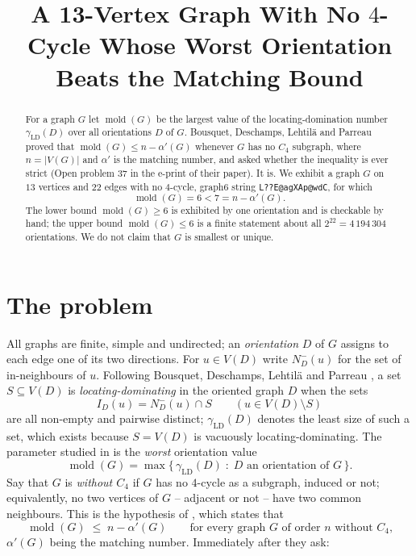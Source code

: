 \documentclass[11pt]{amsart}
\title[A graph with no $4$-cycle beating the matching bound]
{A 13-Vertex Graph With No $4$-Cycle Whose Worst Orientation\\ Beats the Matching Bound}
\date{}
\theoremstyle{definition}
\theoremstyle{remark}
\DeclareMathOperator{\mold}{mold}
\newcommand{\gammaLD}{\gamma_{\mathrm{LD}}}
\newcommand{\Nin}{N^-}
\begin{document}
\begin{abstract}
For a graph $G$ let $\mold(G)$ be the largest value of the locating-domination
number $\gammaLD(D)$ over all orientations $D$ of $G$. Bousquet, Deschamps,
Lehtil\"a and Parreau proved that $\mold(G)\le n-\alpha'(G)$ whenever $G$ has
no $C_4$ subgraph, where $n=|V(G)|$ and $\alpha'$ is the matching number, and
asked whether the inequality is ever strict (Open problem 37 in the e-print of
their paper). It is. We exhibit a graph $G$ on $13$ vertices and $22$ edges
with no $4$-cycle, graph6 string \texttt{L??E@agXAp@wdC}, for which
\[
 \mold(G)=6<7=n-\alpha'(G).
\]
The lower bound $\mold(G)\ge6$ is exhibited by one orientation and is checkable
by hand; the upper bound $\mold(G)\le6$ is a finite statement about all
$2^{22}=4\,194\,304$ orientations. We do not claim that $G$ is smallest or
unique.
\end{abstract}

\maketitle

\section{The problem}

All graphs are finite, simple and undirected; an \emph{orientation} $D$ of $G$
assigns to each edge one of its two directions. For $u\in V(D)$ write
$\Nin_D(u)$ for the set of in-neighbours of $u$. Following Bousquet,
Deschamps, Lehtil\"a and Parreau \cite{BDLP}, a set $S\subseteq V(D)$ is
\emph{locating-dominating} in the oriented graph $D$ when the sets
\[
 I_D(u)=\Nin_D(u)\cap S \qquad (u\in V(D)\setminus S)
\]
are all non-empty and pairwise distinct; $\gammaLD(D)$ denotes the least size
of such a set, which exists because $S=V(D)$ is vacuously
locating-dominating. The parameter studied in \cite[Section~4]{BDLP} is the
\emph{worst} orientation value
\[
 \mold(G)=\max\{\,\gammaLD(D)\;:\;D\text{ an orientation of }G\,\}.
\]
Say that $G$ is \emph{without $C_4$} if $G$ has no $4$-cycle as a subgraph,
induced or not; equivalently, no two vertices of $G$ -- adjacent or not -- have
two common neighbours. This is the hypothesis of \cite[Lemma~34]{BDLP}, which
states that
\begin{equation}\label{eq:L34}
 \mold(G)\;\le\;n-\alpha'(G)
 \qquad\text{for every graph $G$ of order $n$ without $C_4$,}
\end{equation}
$\alpha'(G)$ being the matching number. Immediately after
\cite[Corollary~36]{BDLP} they ask:
\end{document}
